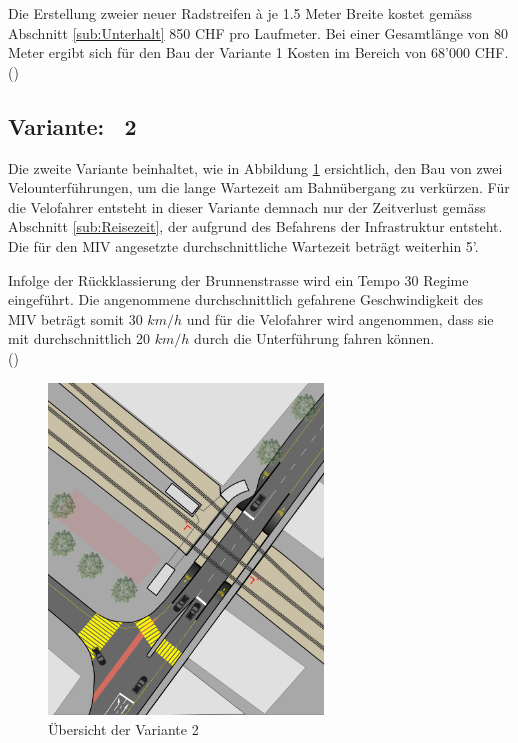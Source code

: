 Die Erstellung zweier neuer Radstreifen à je 1.5 Meter Breite kostet gemäss Abschnitt \ref{sub:Unterhalt} 850 CHF pro Laufmeter. Bei einer Gesamtlänge von 80 Meter ergibt sich für den Bau der Variante 1 Kosten im Bereich von 68'000 CHF. (\cite{Baukosten2010}) 

\pagebreak

\subsection{Variante: \ 2}
\label{subsec:V2}
	
Die zweite Variante beinhaltet, wie in Abbildung \ref{img:V2Ü} ersichtlich, den Bau von zwei Velounterführungen, um die lange Wartezeit am Bahnübergang zu verkürzen. Für die Velofahrer entsteht in dieser Variante demnach nur der Zeitverlust gemäss Abschnitt \ref{sub:Reisezeit}, der aufgrund des Befahrens der Infrastruktur entsteht. Die für den MIV angesetzte durchschnittliche Wartezeit beträgt weiterhin 5'. 

Infolge der Rückklassierung der Brunnenstrasse wird ein Tempo 30 Regime eingeführt. Die angenommene durchschnittlich gefahrene Geschwindigkeit des MIV beträgt somit 30 $km/h$ und für die Velofahrer wird angenommen, dass sie mit durchschnittlich 20 $km/h$ durch die Unterführung fahren können. \\ (\cite{Mikrozensus2015})


\begin{figure}[h!]
	\centering
	\includegraphics[width=0.65\textwidth]{figures/f-04-05-02-a-V2}
	\caption[Übersicht Variante 2]{Übersicht der Variante 2}
	\label{img:V2Ü}
\end{figure}

